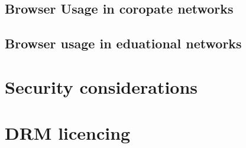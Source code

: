 \subsection{Browser Usage in coropate networks}

\subsection{Browser usage in eduational networks}

\section{Security considerations}
\section{DRM licencing}
